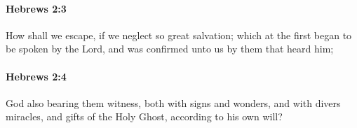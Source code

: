 		\paragraph{Hebrews 2:3} %
			\label{HEBREWS-2-3}

			How shall we escape, if we neglect so great salvation; which at the first began to be spoken by the Lord, and was confirmed unto us by them that heard him;

			\begin{framed}
			\scriptsize
				\begin{compactdesc}
					\item[SBLG] 
				\end{compactdesc}
			\end{framed}

		\paragraph{Hebrews 2:4} %
			\label{HEBREWS-2-4}

			God also bearing them witness, both with signs and wonders, and with divers miracles, and gifts of the Holy Ghost, according to his own will?

